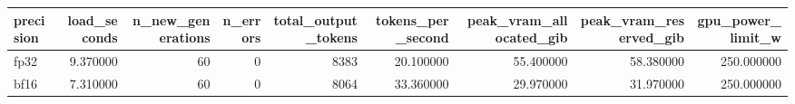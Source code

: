 \begin{tabular}{lrrrrrrrr}
\toprule
precision & load_seconds & n_new_generations & n_errors & total_output_tokens & tokens_per_second & peak_vram_allocated_gib & peak_vram_reserved_gib & gpu_power_limit_w \\
\midrule
fp32 & 9.370000 & 60 & 0 & 8383 & 20.100000 & 55.400000 & 58.380000 & 250.000000 \\
bf16 & 7.310000 & 60 & 0 & 8064 & 33.360000 & 29.970000 & 31.970000 & 250.000000 \\
\bottomrule
\end{tabular}
